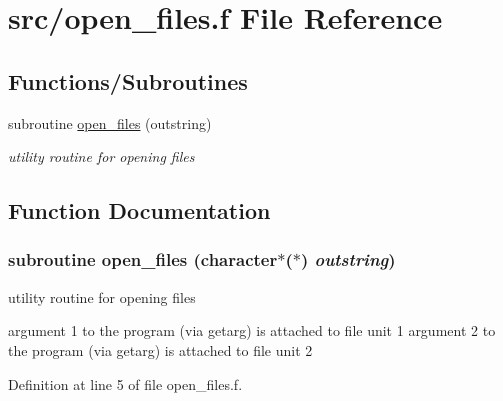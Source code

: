 \hypertarget{open__files_8f}{
\section{src/open\_\-files.f File Reference}
\label{open__files_8f}
}
\subsection*{Functions/Subroutines}
\begin{CompactItemize}
\item 
subroutine \hyperlink{open__files_8f_ea2224f1a3d84bb57bfbbba13313b32b}{open\_\-files} (outstring)
\begin{CompactList}\small\item\em utility routine for opening files \item\end{CompactList}\end{CompactItemize}


\subsection{Function Documentation}
\hypertarget{open__files_8f_ea2224f1a3d84bb57bfbbba13313b32b}{
\subsubsection[open\_\-files]{\setlength{\rightskip}{0pt plus 5cm}subroutine open\_\-files (character$\ast$($\ast$) {\em outstring})}}
\label{open__files_8f_ea2224f1a3d84bb57bfbbba13313b32b}


utility routine for opening files 

argument 1 to the program (via getarg) is attached to file unit 1 argument 2 to the program (via getarg) is attached to file unit 2 

Definition at line 5 of file open\_\-files.f.
